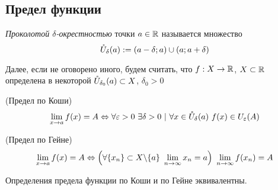 \subsection{Предел функции}

\begin{definition}
	\textit{Проколотой $\delta$-окрестностью} точки $a \in \mathbb{R}$ называется множество
	$$
		\mathring{U}_{\delta}(a) := (a - \delta; a) \cup (a; a + \delta)
	$$
\end{definition}

\begin{note}
	Далее, если не оговорено иного, будем считать, что $f : X \rightarrow \mathbb{R}$, $X \subset \mathbb{R}$ определена в некоторой $\mathring{U}_{\delta_0}(a) \subset X$, $\delta_0 > 0$
\end{note}

\begin{definition} (Предел по Коши)
	$$
		\lim\limits_{x \to a} f(x) = A \Leftrightarrow \forall \varepsilon > 0\ \exists \delta > 0\ |\ \forall x \in \mathring{U}_{\delta}(a)\ f(x) \in U_{\varepsilon}(A)
	$$
\end{definition}

\begin{definition} (Предел по Гейне)
	$$
		\lim\limits_{x \to a} f(x) = A \Leftrightarrow \left(\forall \{x_n\} \subset X \backslash \{a\}\ \lim\limits_{n \to \infty} x_n = a\right)\ \lim\limits_{n \to \infty} f(x_n) = A
	$$
\end{definition}

\begin{theorem}
	Определения предела функции по Коши и по Гейне эквивалентны.
\end{theorem}

